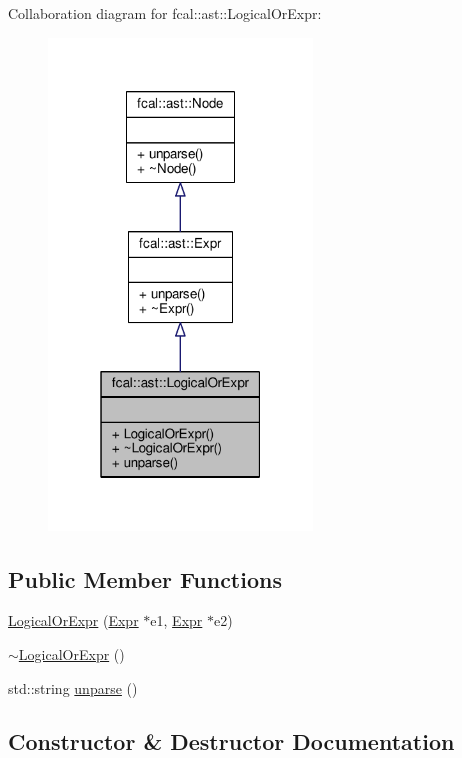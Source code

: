 Collaboration diagram for fcal\+:\+:ast\+:\+:Logical\+Or\+Expr\+:
\nopagebreak
\begin{figure}[H]
\begin{center}
\leavevmode
\includegraphics[width=199pt]{classfcal_1_1ast_1_1LogicalOrExpr__coll__graph}
\end{center}
\end{figure}
\subsection*{Public Member Functions}
\begin{DoxyCompactItemize}
\item 
\hyperlink{classfcal_1_1ast_1_1LogicalOrExpr_a8378f66fc2a926eda3cdc5e43c0e4e78}{Logical\+Or\+Expr} (\hyperlink{classfcal_1_1ast_1_1Expr}{Expr} $\ast$e1, \hyperlink{classfcal_1_1ast_1_1Expr}{Expr} $\ast$e2)
\item 
\hyperlink{classfcal_1_1ast_1_1LogicalOrExpr_aabcd10cab7aa1042c8ac5982df2b1481}{$\sim$\+Logical\+Or\+Expr} ()
\item 
std\+::string \hyperlink{classfcal_1_1ast_1_1LogicalOrExpr_a0553c24537ac515e8f66ada8200a14c9}{unparse} ()
\end{DoxyCompactItemize}


\subsection{Constructor \& Destructor Documentation}
